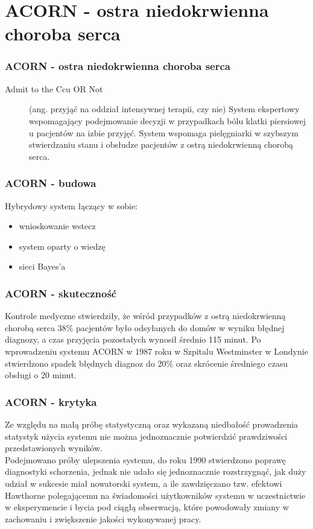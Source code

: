 \section{ACORN - ostra niedokrwienna choroba serca}

\begin{frame}
\frametitle{ACORN - ostra niedokrwienna choroba serca}

\begin{description}  
\item[Admit to the Ccu OR Not] (ang. przyjąć na oddział intensywnej terapii, czy nie) System ekspertowy wspomagający podejmowanie decyzji w przypadkach bólu klatki piersiowej u pacjentów na izbie przyjęć. System wspomaga pielęgniarki w szybszym stwierdzaniu stanu i obsłudze pacjentów z ostrą niedokrwienną chorobą serca.
\end{description}
\end{frame}

\begin{frame}
\frametitle{ACORN - budowa}

Hybrydowy system łączący w sobie:
\begin{itemize}
  \item wnioskowanie wstecz
	\item system oparty o wiedzę
	\item sieci Bayes'a
\end{itemize}

\end{frame}

\begin{frame}
\frametitle{ACORN - skuteczność}
Kontrole medyczne stwierdziły, że wśród przypadków z ostrą niedokrwienną chorobą serca 38\% pacjentów było odsyłanych do domów w wyniku błędnej diagnozy, a czas przyjęcia pozostałych wynosił średnio 115 minut.
Po wprowadzeniu systemu ACORN w 1987 roku w Szpitalu Westminster w Londynie stwierdzono spadek błędnych diagnoz do 20\% oraz skrócenie średniego czasu obsługi o 20 minut.

\end{frame}

\begin{frame}
\frametitle{ACORN - krytyka}

Ze względu na małą próbę statystyczną oraz wykazaną niedbałość prowadzenia statystyk użycia systemu nie można jednoznacznie potwierdzić prawdziwości przedstawionych wyników.\\
Podejmowano próby ulepszenia systemu, do roku 1990 stwierdzono poprawę diagnostyki schorzenia, jednak nie udało się jednoznacznie rozstrzygnąć, jak duży udział w sukcesie miał nowatorski system, a ile zawdzięczano tzw. efektowi Hawthorne polegającemu na świadomości użytkowników systemu w uczestnictwie w eksperymencie i bycia pod ciągłą obserwacją, które powodowały zmiany w zachowaniu i zwiększenie jakości wykonywanej pracy.

\end{frame}

